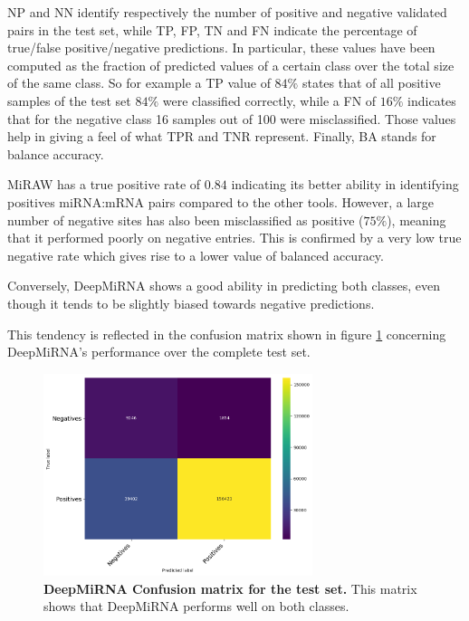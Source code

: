 NP and NN identify respectively the number of positive and negative validated pairs in the test set, while TP, FP, TN and FN indicate the percentage of true/false positive/negative predictions. 
In particular, these values have been computed as the fraction of predicted values of a certain class over the total size of the same class. So for example a TP value of $84\%$ states that of all positive samples of the test set $84\%$ were classified correctly, while a FN of $16\%$ indicates that for the negative class 16 samples out of 100 were misclassified. Those values help in giving a feel of what TPR and TNR represent. Finally, BA stands for balance accuracy.
 
MiRAW has a true positive rate of $0.84$ indicating its better ability in identifying positives miRNA:mRNA pairs compared to the other tools. However, a large number of negative sites has also been misclassified as positive ($75\%$), meaning that it performed poorly on negative entries. This is confirmed by a very low true negative rate which gives rise to a lower value of balanced accuracy.

Conversely, DeepMiRNA shows a good ability in predicting both classes, even though it tends to be slightly biased towards negative predictions. 

This tendency is reflected in the confusion matrix shown in figure \ref{fig:confusion_matrix} concerning DeepMiRNA's performance over the complete test set.

\begin{figure}[h!]
	\centering
	\includegraphics[width=0.7\textwidth, height=0.4\textheight]{Figures/conf_matrix}
	\caption{\textbf{DeepMiRNA Confusion matrix for the test set.} This matrix shows that DeepMiRNA performs well on both classes.}
	\label{fig:confusion_matrix}
\end{figure} 
  


 